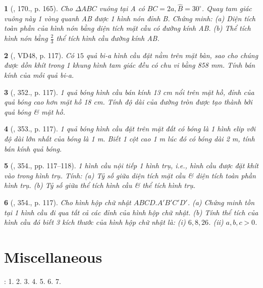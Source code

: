 \documentclass{article}
\newtheorem{baitoan}{}
\begin{document}
\begin{baitoan}[\cite{Tuyen_Toan_9_old}, 170., p. 165]
	Cho $\Delta ABC$ vuông tại A có $BC = 2a,\widehat{B} = 30^\circ$. Quay tam giác vuông này 1 vòng quanh AB được 1 hình nón đỉnh B. Chứng minh: (a) Diện tích toàn phần của hình nón bằng diện tích mặt cầu có đường kính AB. (b) Thể tích hình nón bằng $\frac{2}{3}$ thể tích hình cầu đường kính AB.
\end{baitoan}

\begin{baitoan}[\cite{Binh_Toan_9_tap_2}, VD48, p. 117]
	Có $15$ quả bi-a hình cầu đặt nằm trên mặt bàn, sao cho chúng được dồn khít trong 1 khung hình tam giác đều có chu vi bằng {\rm858 mm}. Tính bán kính của mỗi quả bi-a.
\end{baitoan}

\begin{baitoan}[\cite{Binh_Toan_9_tap_2}, 352., p. 117]
	1 quả bóng hình cầu bán kính {\rm13 cm} nổi trên mặt hồ, đỉnh của quả bóng cao hơn mặt hồ {\rm18 cm}. Tính độ dài của đường tròn được tạo thành bởi quả bóng \& mặt hồ.
\end{baitoan}

\begin{baitoan}[\cite{Binh_Toan_9_tap_2}, 353., p. 117]
	1 quả bóng hình cầu đặt trên mặt đất có bóng là 1 hình elip với độ dài lớn nhất của bóng là {\rm1 m}. Biết 1 cột cao {\rm1 m} lúc đó có bóng dài {\rm2 m}, tính bán kính quả bóng.
\end{baitoan}

\begin{baitoan}[\cite{Binh_Toan_9_tap_2}, 354., pp. 117--118]
	1 hình cầu nội tiếp 1 hình trụ, i.e., hình cầu được đặt khít vào trong hình trụ. Tính: (a) Tỷ số giữa diện tích mặt cầu \& diện tích toàn phần hình trụ. (b) Tỷ số giữa thể tích hình cầu \& thể tích hình trụ.
\end{baitoan}

\begin{baitoan}[\cite{Binh_Toan_9_tap_2}, 354., p. 117]
	Cho hình hộp chữ nhật $ABCD.A'B'C'D'$. (a) Chứng minh tồn tại 1 hình cầu đi qua tất cả các đỉnh của hình hộp chữ nhật. (b) Tính thể tích của hình cầu đó biết 3 kích thước của hình hộp chữ nhật là: (i) $6,8,26$. (ii) $a,b,c > 0$.
\end{baitoan}


\section{Miscellaneous}
\cite[BTCCX, pp. 109--110]{SGK_Toan_9_Canh_Dieu_tap_1}: 1. 2. 3. 4. 5. 6. 7.
\end{document}
